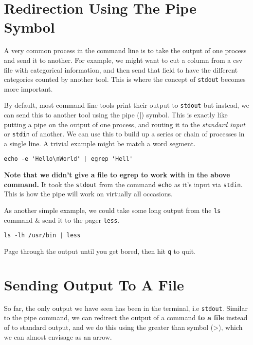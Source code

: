 \section{Redirection Using The Pipe Symbol}
\begin{information}
A very common process in the command line is to take the output of one process and send it to another.
For example, we might want to cut a column from a csv file with categorical information, and then send that field to have the different categories counted by another tool.
This is where the concept of \texttt{stdout} becomes more important. \\
\end{information}

\begin{steps}
By default, most command-line tools print their output to \texttt{stdout} but instead, we can send this to another tool using the pipe (|) symbol.
This is exactly like putting a pipe on the output of one process, and routing it to the \textit{standard input} or \texttt{stdin} of another.
We can use this to build up a series or chain of processes in a single line.
A trivial example might be match a word segment.
\begin{lstlisting}
echo -e 'Hello\nWorld' | egrep 'Hell'
\end{lstlisting}
\end{steps}

\begin{information}
\textbf{Note that we didn't give a file to egrep to work with in the above command.}
It took the \texttt{stdout} from the command \texttt{echo} as it's input via \texttt{stdin}.
This is how the pipe will work on virtually all occasions.
\end{information}

\begin{steps}
As another simple example, we could take some long output from the \texttt{ls} command \& send it to the pager \texttt{less}.
\begin{lstlisting}
ls -lh /usr/bin | less
\end{lstlisting}
Page through the output until you get bored, then hit \texttt{q} to quit.
\end{steps}

\section{Sending Output To A File}
\begin{information}
So far, the only output we have seen has been in the terminal, i.e  \texttt{stdout}.
Similar to the pipe command, we can redirect the output of a command \textbf{to a file} instead of to standard output, and we do this using the greater than symbol (\textgreater), which we can almost envisage as an arrow.\\

\end{information}

